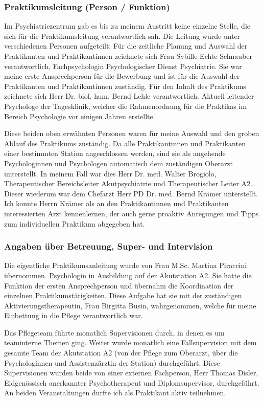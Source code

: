 \subsubsection{Praktikumsleitung (Person / Funktion)}
Im Psychiatriezentrum gab es bis zu meinem Austritt keine einzelne Stelle, die sich für die Praktikumsleitung verantwortlich sah. Die Leitung wurde unter verschiedenen Personen aufgeteilt: Für die zeitliche Planung und Auswahl der Praktikanten und Praktikantinnen zeichnete sich Frau Sybille Echte-Schnauber verantwortlich, Fachpsychologin Psychologischer Dienst Psychiatrie. Sie war meine erste Ansprechperson für die Bewerbung und ist für die Auswahl der Praktikanten und Praktikantinnen zuständig. Für den Inhalt des Praktikums zeichnete sich Herr Dr. biol. hum. Bernd Lehle verantwortlich. Aktuell leitender Psychologe der Tagesklinik, welcher die Rahmenordnung für die Praktikas im Bereich Psychologie vor einigen Jahren erstellte. 

Diese beiden oben erwähnten Personen waren für meine Auswahl und den groben Ablauf des Praktikums zuständig. Da alle Praktikantinnen und Praktikanten einer bestimmten Station angeschlossen werden, sind sie als angehende Psychologinnen und Psychologen automatisch dem zuständigen Oberarzt unterstellt. In meinem Fall war dies Herr Dr. med. Walter Brogiolo, Therapeutischer Bereichsleiter Akutpsychiatrie und Therapeutischer Leiter A2. Dieser wiederum war dem Chefarzt Herr PD Dr. med. Bernd Krämer unterstellt. Ich konnte Herrn Krämer als an den Praktikantinnen und Praktikanten interessierten Arzt kennenlernen, der auch gerne proaktiv Anregungen und Tipps zum individuellen Praktikum abgegeben hat.

\subsubsection{Angaben über Betreuung, Super- und Intervision}
Die eigentliche Praktikumsanleitung wurde von Frau M.Sc. Martina Piraccini übernommen. Psychologin in Ausbildung auf der Akutstation A2. Sie hatte die Funktion der ersten Ansprechperson und übernahm die Koordination der einzelnen Praktikumstätigkeiten. Diese Aufgabe hat sie mit der zuständigen Aktivierungstherapeutin, Frau Birgitta Busin, wahrgenommen, welche für meine Einbettung in die Pflege verantwortlich war. 

Das Pflegeteam führte monatlich Supervisionen durch, in denen es um teaminterne Themen ging. Weiter wurde monatlich eine Fallsupervision mit dem gesamte Team der Akutstation A2 (von der Pflege zum Oberarzt, über die Psychologinnen und Assistenzärztin der Station) durchgeführt. Diese Supervisionen wurden beide von einer externen Fachperson, Herr Thomas Disler, Eidgenössisch anerkannter Psychotherapeut und Diplomsupervisor, durchgeführt. An beiden Veranstaltungen durfte ich als Praktikant aktiv teilnehmen. 

